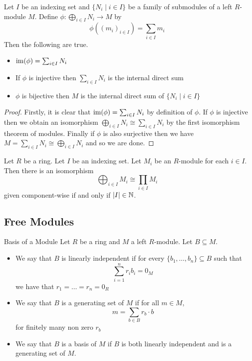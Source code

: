 \documentclass[a4paper]{article}
\begin{document}
\begin{lmm}{}{} Let $I$ be an indexing set and $\{N_i\;|\;i\in I\}$ be a family of submodules of a left $R$-module $M$. Define $\phi:\bigoplus_{i\in I}N_i\to M$ by $$\phi\left((m_i)_{i\in I}\right)=\sum_{i\in I}m_i$$ Then the following are true. 
\begin{itemize}
\item $\operatorname{im}(\phi)=\sum_{i\in I}N_i$
\item If $\phi$ is injective then $\sum_{i\in I}N_i$ is the internal direct sum
\item $\phi$ is bijective then $M$ is the internal direct sum of $\{N_i\;|\;i\in I\}$
\end{itemize} \tcbline
\begin{proof}
Firstly, it is clear that $\operatorname{im}(\phi)=\sum_{i\in I}N_i$ by definition of $\phi$. If $\phi$ is injective then we obtain an isomorphism $\bigoplus_{i\in I}N_i\cong\sum_{i\in I}N_i$ by the first isomorphism theorem of modules. Finally if $\phi$ is also surjective then we have $M=\sum_{i\in I}N_i\cong\bigoplus_{i\in I}N_i$ and so we are done. 
\end{proof}
\end{lmm}

\begin{prp}{}{} Let $R$ be a ring. Let $I$ be an indexing set. Let $M_i$ be an $R$-module for each $i\in I$. Then there is an isomorphism $$\bigoplus_{i\in I}M_i\cong\prod_{i\in I}M_i$$ given component-wise if and only if $\abs{I}\in\mathbb{N}$. 
\end{prp}

\subsection{Free Modules}
\begin{defn}{Basis of a Module}{} Let $R$ be a ring and $M$ a left $R$-module. Let $B\subseteq M$. 
\begin{itemize}
\item We say that $B$ is linearly independent if for every $\{b_1,\dots,b_n\}\subseteq B$ such that $$\sum_{i=1}^nr_ib_i=0_M$$ we have that $r_1=\dots=r_n=0_R$
\item We say that $B$ is a generating set of $M$ if for all $m\in M$, $$m=\sum_{b\in B}r_b\cdot b$$ for finitely many non zero $r_b$
\item We say that $B$ is a basis of $M$ if $B$ is both linearly independent and is a generating set of $M$. 
\end{itemize}
\end{defn}
\end{document}
